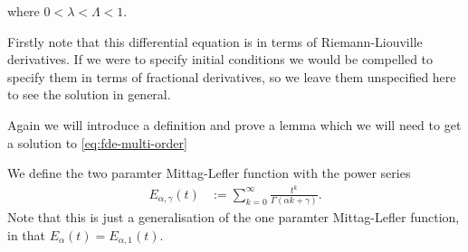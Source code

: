 where $ 0 < \lambda < \Lambda < 1 $.


Firstly note that this differential equation is in terms of Riemann-Liouville derivatives. If we were to specify
initial conditions we would be compelled to specify them in terms of fractional derivatives, so we leave them
unspecified here to see the solution in general.

Again we will introduce a definition and prove a lemma which we will need to get a solution to \ref{eq:fde-multi-order}

\begin{definition}
	\label{def:mit-lef-2}
	We define the two paramter Mittag-Lefler function with the power series
	\begin{align*}
		E_{\alpha, \gamma}(t) &:= \sum_{k=0}^\infty \frac{t^k}{\Gamma(\alpha k + \gamma)}.
	\end{align*}
	Note that this is just a generalisation of the one paramter Mittag-Lefler function, in that
	$ E_{\alpha}(t) = E_{\alpha, 1}(t) $.
\end{definition}

